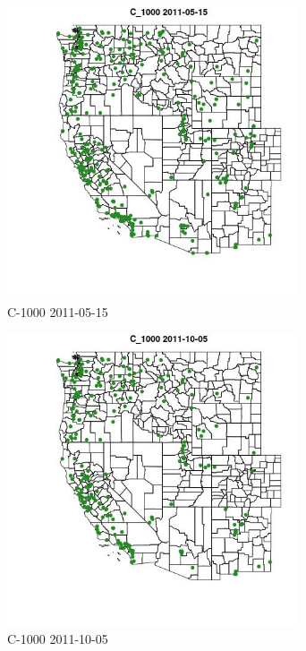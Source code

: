 \begin{figure} 
\centering  
\includegraphics[width=0.77\textwidth]{Code_Outputs/ML_input_report_ML_input_PM25_Step5_part_d_de_duplicated_aves_ML_input_MapObsC_10002011-05-15.jpg} 
\caption{\label{fig:ML_input_report_ML_input_PM25_Step5_part_d_de_duplicated_aves_ML_inputMapObsC_10002011-05-15}C-1000 2011-05-15} 
\end{figure} 
 

\begin{figure} 
\centering  
\includegraphics[width=0.77\textwidth]{Code_Outputs/ML_input_report_ML_input_PM25_Step5_part_d_de_duplicated_aves_ML_input_MapObsC_10002011-10-05.jpg} 
\caption{\label{fig:ML_input_report_ML_input_PM25_Step5_part_d_de_duplicated_aves_ML_inputMapObsC_10002011-10-05}C-1000 2011-10-05} 
\end{figure} 
 

